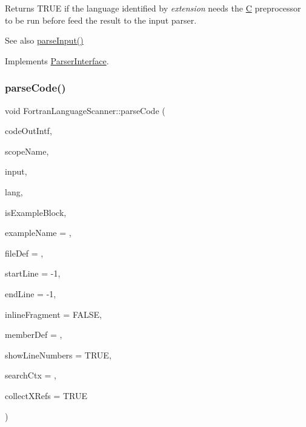Returns T\+R\+UE if the language identified by {\itshape extension} needs the \mbox{\hyperlink{class_c}{C}} preprocessor to be run before feed the result to the input parser. \begin{DoxySeeAlso}{See also}
\mbox{\hyperlink{class_fortran_language_scanner_a6f2e7fa4a4d46ae48289cd135f9f495d}{parse\+Input()}} 
\end{DoxySeeAlso}


Implements \mbox{\hyperlink{class_parser_interface_a36c669b17b64a6e3847f27d70a5398d2}{Parser\+Interface}}.

\mbox{\label{class_fortran_language_scanner_a76c29cd4656300093fba9179184a4a7c}} 
\subsubsection{\texorpdfstring{parseCode()}{parseCode()}}
{\footnotesize\ttfamily void Fortran\+Language\+Scanner\+::parse\+Code (\begin{DoxyParamCaption}\item[{\mbox{\hyperlink{class_code_output_interface}{Code\+Output\+Interface}} \&}]{code\+Out\+Intf,  }\item[{const char $\ast$}]{scope\+Name,  }\item[{const \mbox{\hyperlink{class_q_c_string}{Q\+C\+String}} \&}]{input,  }\item[{\mbox{\hyperlink{types_8h_a9974623ce72fc23df5d64426b9178bf2}{Src\+Lang\+Ext}}}]{lang,  }\item[{bool}]{is\+Example\+Block,  }\item[{const char $\ast$}]{example\+Name = {},  }\item[{\mbox{\hyperlink{class_file_def}{File\+Def}} $\ast$}]{file\+Def = {},  }\item[{int}]{start\+Line = {\ttfamily -\/1},  }\item[{int}]{end\+Line = {\ttfamily -\/1},  }\item[{bool}]{inline\+Fragment = {\ttfamily FALSE},  }\item[{\mbox{\hyperlink{class_member_def}{Member\+Def}} $\ast$}]{member\+Def = {},  }\item[{bool}]{show\+Line\+Numbers = {\ttfamily TRUE},  }\item[{\mbox{\hyperlink{class_definition}{Definition}} $\ast$}]{search\+Ctx = {},  }\item[{bool}]{collect\+X\+Refs = {\ttfamily TRUE} }\end{DoxyParamCaption})\hspace{0.3cm}{\ttfamily [virtual]}}

